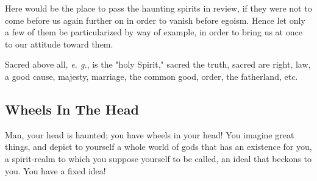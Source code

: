\documentclass[a4paper]{book}
\begin{document}
Here would be the place to pass the haunting spirits in review, if they were 
not to come before us again further on in order to vanish before egoism. Hence 
let only a few of them be particularized by way of example, in order to bring 
us at once to our attitude toward them.

Sacred above all, \textit{e. g.}, is the "{}holy Spirit,"{} sacred the truth, 
sacred are right, law, a good cause, majesty, marriage, the common good, 
order, the fatherland, etc.

\subsection[Wheels In The Head]{\centering Wheels In The Head}

Man, your head is haunted; you have wheels in your head! You imagine great 
things, and depict to yourself a whole world of gods that has an existence for 
you, a spirit-realm to which you suppose yourself to be called, an ideal that 
beckons to you. You have a fixed idea!
\end{document}
